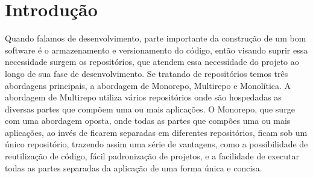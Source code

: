 \section{Introdução}

Quando falamos de desenvolvimento, parte importante da construção de um bom software é o armazenamento e versionamento do código, então visando suprir essa necessidade surgem os repositórios, que atendem essa necessidade do projeto ao longo de sua fase de desenvolvimento. Se tratando de repositórios temos três abordagens principais, a abordagem de Monorepo, Multirepo e Monolítica. A abordagem de Multirepo utiliza vários repositórios onde são hospedadas as diversas partes que compõem uma ou mais aplicações. O Monorepo, que surge com uma abordagem oposta, onde todas as partes que compões uma ou mais aplicações, ao invés de ficarem separadas em diferentes repositórios, ficam sob um único repositório, trazendo assim uma série de vantagens, como a possibilidade de reutilização de código, fácil padronização de projetos, e a facilidade de executar todas as partes separadas da aplicação de uma forma única e concisa. 